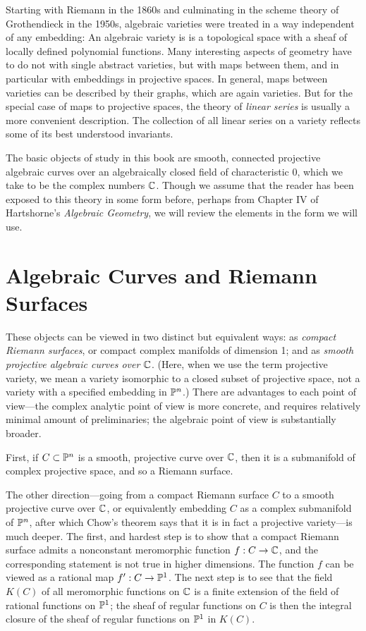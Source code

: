 Starting with Riemann in the 1860s and culminating in the scheme theory of Grothendieck in the 1950s, algebraic varieties were treated in a way independent of any embedding: An algebraic variety is is a topological space with a sheaf of locally
defined polynomial functions. Many interesting aspects of geometry have to do not with single abstract varieties, but with maps between them, and in particular with embeddings in projective spaces. In general, maps between varieties can be described by their graphs, which are again varieties.  But for the special case of maps to projective spaces, the theory of \emph{linear series} is usually a more convenient description. The collection of all linear series on a variety reflects some of its best understood invariants. 

The basic objects of study in this book are smooth, connected projective algebraic curves over an algebraically closed field of characteristic 0, which we take to be the complex numbers ${\mathbb C}$. Though we assume that the reader has been exposed to this theory in some form before, perhaps from Chapter IV of Hartshorne's {\it Algebraic Geometry}, we will review the elements  in the form we will use. 

\section{Algebraic Curves and Riemann Surfaces}

These objects can be viewed in two distinct but equivalent ways: as \emph{compact Riemann surfaces}, or compact complex manifolds of dimension 1; and as \emph{smooth projective algebraic curves over ${\mathbb C}$}. (Here, when we use the term projective variety, we mean a variety isomorphic to a closed subset of projective space, not a variety with a specified embedding in ${\mathbb P}^n$.) There are advantages to each point of view---the complex analytic point of view is more concrete, and requires relatively minimal amount of preliminaries; the algebraic point of view is substantially broader. 

First, if $C \subset {\mathbb P}^n$ is a smooth, projective curve over ${\mathbb C}$, then it is a submanifold of complex projective space, and so a Riemann surface. 

The other direction---going from a compact Riemann surface $C$ to a smooth projective curve over ${\mathbb C}$, or equivalently embedding $C$ as a complex submanifold of ${\mathbb P}^n$, after which Chow's theorem says that it is in fact a projective variety---is much deeper. The first, and hardest step is to show that a compact Riemann surface admits a nonconstant meromorphic function $f:C \to {\mathbb C}$, and the corresponding statement is not true in higher dimensions. The function $f$ can be viewed as
a rational map $f': C\to {\mathbb P}^{1}$. The next step is to see that the field $K(C)$ of all meromorphic functions
on ${\mathbb C}$ is a finite extension of the field of rational functions on ${\mathbb P}^{1}$; the sheaf of regular functions on $C$ is then the integral closure of the sheaf of regular functions on ${\mathbb P}^{1}$ in $K(C)$.

